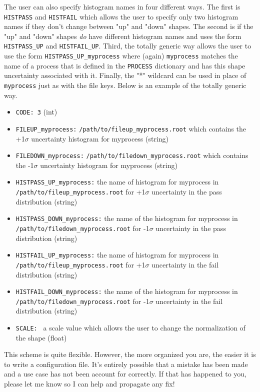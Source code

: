 \documentclass[letter]{article}
\begin{document}
\begin{itemize}
                The user can also specify histogram names in four different ways. The first is \verb"HISTPASS" and \verb"HISTFAIL" which allows the user to specify only two histogram names if they don't change between "up" and "down" shapes. The second is if the "up" and "down" shapes \textit{do} have different histogram names and uses the form \verb"HISTPASS_UP" and \verb"HISTFAIL_UP". Third, the totally generic way allows the user to use the form \verb"HISTPASS_UP_myprocess" where (again) \verb"myprocess" matches the name of a process that is defined in the \verb"PROCESS" dictionary and has this shape uncertainty associated with it. Finally, the "*" wildcard can be used in place of \verb"myprocess" just as with the file keys. Below is an example of the totally generic way.
                \begin{itemize}
                    \item \verb"CODE: 3" (int)
                    \item \verb"FILEUP_myprocess:" \verb"/path/to/fileup_myprocess.root" which contains the +1$\sigma$ uncertainty histogram for myprocess (string)
                    \item \verb"FILEDOWN_myprocess:" \verb"/path/to/filedown_myprocess.root" which contains the -1$\sigma$ uncertainty histogram for myprocess (string)
                    \item \verb"HISTPASS_UP_myprocess:" the name of histogram for myprocess in \verb"/path/to/fileup_myprocess.root" for +1$\sigma$ uncertainty in the pass distribution (string)
                    \item \verb"HISTPASS_DOWN_myprocess:" the name of the histogram for myprocess in \verb"/path/to/filedown_myprocess.root" for -1$\sigma$ uncertainty in the pass distribution (string)
                    \item \verb"HISTFAIL_UP_myprocess:" the name of histogram for myprocess in \verb"/path/to/fileup_myprocess.root" for +1$\sigma$ uncertainty in the fail distribution (string)
                    \item \verb"HISTFAIL_DOWN_myprocess:" the name of the histogram for myprocess in \verb"/path/to/filedown_myprocess.root" for -1$\sigma$ uncertainty in the fail distribution (string)
                    \item \verb"SCALE: " a scale value which allows the user to change the normalization of the shape (float)
                \end{itemize}
            \end{itemize}
            This scheme is quite flexible. However, the more organized you are, the easier it is to write a configuration file. It's entirely possible that a mistake has been made and a use case has not been account for correctly. If that has happened to you, please let me know so I can help and propagate any fix!
\end{document}
